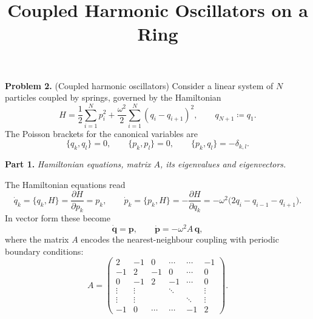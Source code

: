 \documentclass[12pt]{article}
\title{\textbf{Coupled Harmonic Oscillators on a Ring}}
\date{}
\newcommand{\be}{\begin{equation}}
\newcommand{\ee}{\end{equation}}
\theoremstyle{plain}
\begin{document}
\maketitle

\noindent\textbf{Problem 2.} (Coupled harmonic oscillators)
Consider a linear system of $N$ particles coupled by springs, governed by the Hamiltonian
\be
  H = \frac{1}{2}\sum_{i=1}^N p_i^2 + \frac{\omega^2}{2}\sum_{i=1}^N (q_i - q_{i+1})^2,
  \qquad q_{N+1} \coloneqq q_1.
\ee
The Poisson brackets for the canonical variables are
\be
  \{q_k, q_l\} = 0, \qquad \{p_k, p_l\} = 0, \qquad \{p_k, q_l\} = -\delta_{k,l}.
\ee

\bigskip

\noindent\textbf{Part 1.} \textit{Hamiltonian equations, matrix $A$, its eigenvalues and eigenvectors.}

\medskip
\noindent The Hamiltonian equations read
\be
  \dot{q}_k = \{q_k, H\} = \frac{\partial H}{\partial p_k} = p_k, \qquad
  \dot{p}_k = \{p_k, H\} = -\frac{\partial H}{\partial q_k}
            = -\omega^2\bigl(2q_i - q_{i-1} - q_{i+1}\bigr).
\ee
In vector form these become
\be
  \dot{\bm{q}} = \bm{p}, \qquad \dot{\bm{p}} = -\omega^2 A\,\bm{q},
\ee
where the matrix $A$ encodes the nearest-neighbour coupling with periodic boundary conditions:
\be
  A = \begin{pmatrix}
        2  & -1 &  0 & \cdots & \cdots & -1 \\
       -1  &  2 & -1 &  0    & \cdots &  0 \\
        0  & -1 &  2 & -1    & \cdots &  0 \\
       \vdots & \vdots & & \ddots & & \vdots \\
       \vdots & \vdots & & & \ddots & \vdots \\
       -1  &  0 & \cdots & \cdots & -1 &  2
      \end{pmatrix}.
\ee
\end{document}

